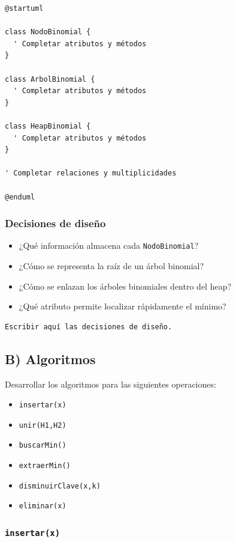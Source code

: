 \documentclass[11pt]{article}
\begin{document}
\begin{verbatim}
@startuml

class NodoBinomial {
  ' Completar atributos y métodos
}

class ArbolBinomial {
  ' Completar atributos y métodos
}

class HeapBinomial {
  ' Completar atributos y métodos
}

' Completar relaciones y multiplicidades

@enduml
\end{verbatim}

\subsubsection{Decisiones de diseño}
\label{sec:org079cd21}

\begin{itemize}
\item ¿Qué información almacena cada \texttt{NodoBinomial}?
\item ¿Cómo se representa la raíz de un árbol binomial?
\item ¿Cómo se enlazan los árboles binomiales dentro del heap?
\item ¿Qué atributo permite localizar rápidamente el mínimo?
\end{itemize}

\begin{verbatim}
Escribir aquí las decisiones de diseño.
\end{verbatim}

\subsection{B) Algoritmos}
\label{sec:orgb646ac8}

Desarrollar los algoritmos para las siguientes operaciones:

\begin{itemize}
\item \texttt{insertar(x)}
\item \texttt{unir(H1,H2)}
\item \texttt{buscarMin()}
\item \texttt{extraerMin()}
\item \texttt{disminuirClave(x,k)}
\item \texttt{eliminar(x)}
\end{itemize}

\subsubsection{\texttt{insertar(x)}}
\label{sec:org46ece6b}
\end{document}

